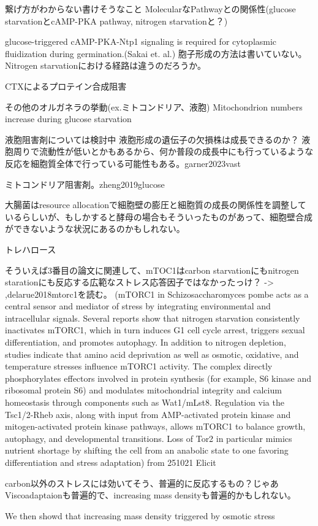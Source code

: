 繋げ方がわからない書けそうなこと
MolecularなPathwayとの関係性(glucose starvationとcAMP-PKA pathway, nitrogen starvationと？)

glucose-triggered cAMP-PKA-Ntp1 signaling is required for cytoplasmic fluidization during germination.(Sakai et. al.)
胞子形成の方法は書いていない。Nitrogen starvationにおける経路は違うのだろうか。

CTXによるプロテイン合成阻害

その他のオルガネラの挙動(ex.ミトコンドリア、液胞)
Mitochondrion numbers increase during glucose starvation

液胞阻害剤については検討中
液胞形成の遺伝子の欠損株は成長できるのか？
液胞周りで流動性が低いとかもあるから、何か普段の成長中にも行っているような反応を細胞質全体で行っている可能性もある。garner2023vast

ミトコンドリア阻害剤。zheng2019glucose

大腸菌はresource allocationで細胞壁の膨圧と細胞質の成長の関係性を調整しているらしいが、もしかすると酵母の場合もそういったものがあって、細胞壁合成ができないような状況にあるのかもしれない。

トレハロース



そういえば3番目の論文に関連して、mTOC1はcarbon starvationにもnitrogen starationにも反応する広範なストレス応答因子ではなかったっけ？ -> ,delarue2018mtorc1を読む。
(mTORC1 in Schizosaccharomyces pombe acts as a central sensor and mediator of stress by integrating environmental and intracellular signals. Several reports show that nitrogen starvation consistently inactivates mTORC1, which in turn induces G1 cell cycle arrest, triggers sexual differentiation, and promotes autophagy. In addition to nitrogen depletion, studies indicate that amino acid deprivation as well as osmotic, oxidative, and temperature stresses influence mTORC1 activity.
The complex directly phosphorylates effectors involved in protein synthesis (for example, S6 kinase and ribosomal protein S6) and modulates mitochondrial integrity and calcium homeostasis through components such as Wat1/mLst8. Regulation via the Tsc1/2-Rheb axis, along with input from AMP-activated protein kinase and mitogen-activated protein kinase pathways, allows mTORC1 to balance growth, autophagy, and developmental transitions. Loss of Tor2 in particular mimics nutrient shortage by shifting the cell from an anabolic state to one favoring differentiation and stress adaptation) from 251021 Elicit

carbon以外のストレスには効いてそう、普遍的に反応するもの？じゃあViscoadaptaionも普遍的で、increasing mass densityも普遍的かもしれない。

We then showd that increasing mass density triggered by osmotic stress 
